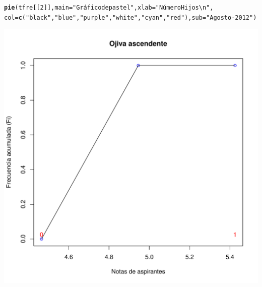 \documentclass[10pt,a4paper]{article}\usepackage[]{graphicx}\usepackage[]{color}
\makeatletter
\def\maxwidth{ %
  \ifdim\Gin@nat@width>\linewidth
    \linewidth
  \else
    \Gin@nat@width
  \fi
}
\newcommand{\hlnum}[1]{\textcolor[rgb]{0.686,0.059,0.569}{#1}}%
\newcommand{\hlstr}[1]{\textcolor[rgb]{0.192,0.494,0.8}{#1}}%
\newcommand{\hlstd}[1]{\textcolor[rgb]{0.345,0.345,0.345}{#1}}%
\newcommand{\hlkwc}[1]{\textcolor[rgb]{0.333,0.667,0.333}{#1}}%
\newcommand{\hlkwd}[1]{\textcolor[rgb]{0.737,0.353,0.396}{\textbf{#1}}}%
\newenvironment{kframe}{%
 \def\at@end@of@kframe{}%
 \ifinner\ifhmode%
  \def\at@end@of@kframe{\end{minipage}}%
  \begin{minipage}{\columnwidth}%
 \fi\fi%
 \def\FrameCommand##1{\hskip\@totalleftmargin \hskip-\fboxsep
 \colorbox{shadecolor}{##1}\hskip-\fboxsep
     \hskip-\linewidth \hskip-\@totalleftmargin \hskip\columnwidth}%
 \MakeFramed {\advance\hsize-\width
   \@totalleftmargin\z@ \linewidth\hsize
   \@setminipage}}%
 {\par\unskip\endMakeFramed%
 \at@end@of@kframe}
\newenvironment{knitrout}{}{} %
\makeatother
\begin{document}
\begin{knitrout}
\color{fgcolor}\begin{kframe}
\begin{alltt}
  \hlkwd{pie}\hlstd{(tfre[[}\hlnum{2}\hlstd{]],} \hlkwc{main}\hlstd{=}\hlstr{"Gráfico de pastel"}\hlstd{,} \hlkwc{xlab}\hlstd{=}\hlstr{"Número Hijos \textbackslash{}n"}\hlstd{,}
      \hlkwc{col}\hlstd{=}\hlkwd{c}\hlstd{(}\hlstr{"black"}\hlstd{,} \hlstr{"blue"}\hlstd{,} \hlstr{"purple"}\hlstd{,} \hlstr{"white"}\hlstd{,} \hlstr{"cyan"}\hlstd{,} \hlstr{"red"}\hlstd{),} \hlkwc{sub}\hlstd{=}\hlstr{"Agosto-2012"}\hlstd{)}
\end{alltt}
\end{kframe}
\includegraphics[width=\maxwidth]{figure/unnamed-chunk-15-1} 

\end{knitrout}
  
\end{document}
